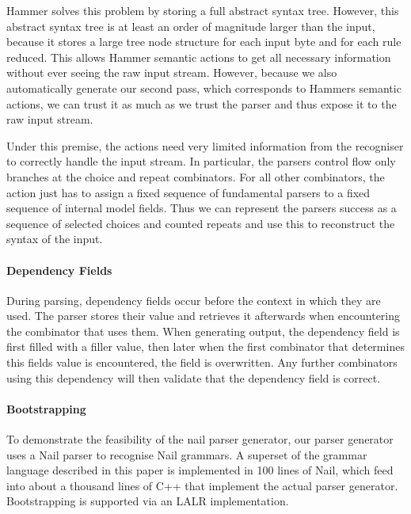 Hammer solves this problem by storing a full abstract syntax tree. However, this
abstract syntax tree is at least an order of magnitude larger than the input,
because it stores a large tree node structure for each input byte and for each
rule reduced. This allows Hammer semantic actions to get all necessary
information without ever seeing the raw input stream. However, because we also
automatically generate our second pass, which corresponds to Hammers semantic
actions, we can trust it as much as we trust the parser and thus expose it to
the raw input stream.

Under this premise, the actions need very limited information from the
recogniser to correctly handle the input stream. In particular, the parsers
control flow only branches at the choice and repeat combinators. For all other
combinators, the action just has to assign a fixed sequence of fundamental
parsers to a fixed sequence of internal model fields. Thus we can represent the
parsers success as a sequence of selected choices and counted repeats and use
this to reconstruct the syntax of the
input. %
\paragraph{Dependency Fields}
During parsing, dependency fields occur before the context in which they are
used. The parser stores their value and retrieves it afterwards when
encountering the combinator that uses them. When generating output, the
dependency field is first filled with a filler value, then later when the first
combinator that determines this fields value is encountered, the field is
overwritten. Any further combinators using this dependency will then validate
that the dependency field is correct.
\paragraph{Bootstrapping}
To demonstrate the feasibility of the nail parser generator, our parser
generator uses a Nail parser to recognise Nail grammars. A superset of the
grammar language described in this paper is implemented in 100 lines of Nail,
which feed into about a thousand lines of C++ that implement the actual parser
generator. Bootstrapping is supported via an LALR implementation.
